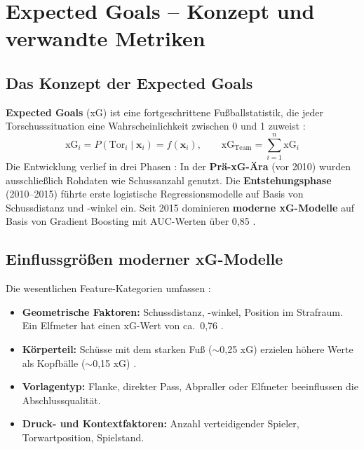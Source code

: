 \section{Expected Goals -- Konzept und verwandte Metriken}
\label{sec:expected-goals}

\subsection{Das Konzept der Expected Goals}

\textbf{Expected Goals} (xG) ist eine fortgeschrittene Fußballstatistik,
die jeder Torschusssituation eine Wahrscheinlichkeit zwischen 0 und 1
zuweist \cite{Spearman2018,AnzerBauer2021}:
\begin{equation}
    \text{xG}_i = P(\text{Tor}_i \mid \mathbf{x}_i) = f(\mathbf{x}_i),
    \qquad
    \text{xG}_{\text{Team}} = \sum_{i=1}^{n} \text{xG}_i
\end{equation}
Die Entwicklung verlief in drei Phasen \cite{Wheatcroft2022}: In der
\textbf{Prä-xG-Ära} (vor 2010) wurden ausschließlich Rohdaten wie
Schussanzahl genutzt. Die \textbf{Entstehungsphase} (2010--2015) führte
erste logistische Regressionsmodelle auf Basis von Schussdistanz und
-winkel ein. Seit 2015 dominieren \textbf{moderne xG-Modelle} auf Basis
von Gradient Boosting mit AUC-Werten über 0,85 \cite{AnzerBauer2021}.

\subsection{Einflussgrößen moderner xG-Modelle}

Die wesentlichen Feature-Kategorien umfassen \cite{AnzerBauer2021,BauerEpstein2023,PalmerEtAl2021}:

\begin{itemize}
    \item \textbf{Geometrische Faktoren:} Schussdistanz, -winkel, Position
          im Strafraum. Ein Elfmeter hat einen xG-Wert von ca.\ 0,76
          \cite{PalmerEtAl2021}.
    \item \textbf{Körperteil:} Schüsse mit dem starken Fuß ($\sim$0,25 xG)
          erzielen höhere Werte als Kopfbälle ($\sim$0,15 xG)
          \cite{PalmerEtAl2021}.
    \item \textbf{Vorlagentyp:} Flanke, direkter Pass, Abpraller oder
          Elfmeter beeinflussen die Abschlussqualität.
    \item \textbf{Druck- und Kontextfaktoren:} Anzahl verteidigender
          Spieler, Torwartposition, Spielstand.
\end{itemize}

